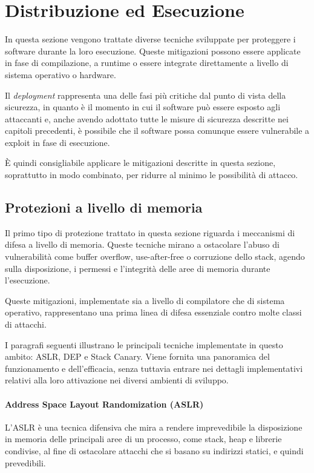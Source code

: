 \section{Distribuzione ed Esecuzione}
\label{sec:deployment}

In questa sezione vengono trattate diverse tecniche sviluppate per proteggere i software
durante la loro esecuzione. Queste mitigazioni possono essere applicate in fase
di compilazione, a runtime o essere integrate direttamente a livello di sistema operativo
o hardware.

Il \textit{deployment} rappresenta una delle fasi più critiche dal punto di
vista della sicurezza, in quanto è il momento in cui il software può essere esposto
agli attaccanti e, anche avendo adottato tutte le misure di sicurezza descritte
nei capitoli precedenti, è possibile che il software possa comunque essere vulnerabile
a exploit in fase di esecuzione.

È quindi consigliabile applicare le mitigazioni descritte in questa sezione,
soprattutto in modo combinato, per ridurre al minimo le possibilità di attacco.

\subsection{Protezioni a livello di memoria}
\label{sec:memory-protection}

Il primo tipo di protezione trattato in questa sezione riguarda i meccanismi di
difesa a livello di memoria. Queste tecniche mirano a ostacolare l'abuso di vulnerabilità
come buffer overflow, use-after-free o corruzione dello stack, agendo sulla disposizione,
i permessi e l'integrità delle aree di memoria durante l'esecuzione.

Queste mitigazioni, implementate sia a livello di compilatore che di sistema operativo,
rappresentano una prima linea di difesa essenziale contro molte classi di
attacchi.

I paragrafi seguenti illustrano le principali tecniche implementate in questo
ambito: ASLR, DEP e Stack Canary. Viene fornita una panoramica del funzionamento
e dell'efficacia, senza tuttavia entrare nei dettagli implementativi relativi
alla loro attivazione nei diversi ambienti di sviluppo.

\paragraph{Address Space Layout Randomization (ASLR)}
L'ASLR è una tecnica difensiva che mira a rendere imprevedibile la disposizione in
memoria delle principali aree di un processo, come stack, heap e librerie condivise,
al fine di ostacolare attacchi che si basano su indirizzi statici, e quindi prevedibili.

